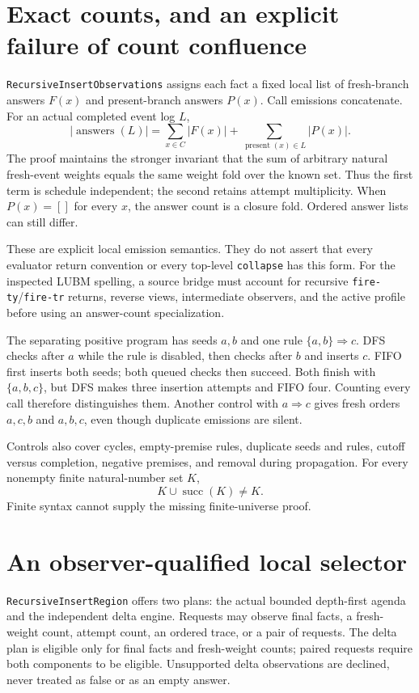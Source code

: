 \documentclass[11pt,a4paper]{article}
\newcommand{\code}[1]{\nolinkurl{#1}}
\begin{document}
\section{Exact counts, and an explicit failure of count confluence}

\code{RecursiveInsertObservations} assigns each fact a fixed local list of
fresh-branch answers $F(x)$ and present-branch answers $P(x)$. Call emissions
concatenate. For an actual completed event log $L$,
\[
  |\operatorname{answers}(L)|
  =\sum_{x\in C}|F(x)|
    +\sum_{\operatorname{present}(x)\in L}|P(x)|.
\]
The proof maintains the stronger invariant that the sum of arbitrary natural
fresh-event weights equals the same weight fold over the known set. Thus
the first term is schedule independent; the second retains attempt
multiplicity. When $P(x)=[]$ for every $x$, the answer count is a closure
fold. Ordered answer lists can still differ.

These are explicit local emission semantics. They do not assert that every
evaluator return convention or every top-level \code{collapse} has this form.
For the inspected LUBM spelling, a source bridge must account for recursive
\code{fire-ty}/\code{fire-tr} returns, reverse views, intermediate observers,
and the active profile before using an answer-count specialization.

The separating positive program has seeds $a,b$ and one rule
$\{a,b\}\Rightarrow c$. DFS checks after $a$ while the rule is disabled,
then checks after $b$ and inserts $c$. FIFO first inserts both seeds; both
queued checks then succeed. Both finish with $\{a,b,c\}$, but DFS makes three
insertion attempts and FIFO four. Counting every call therefore distinguishes
them. Another control with $a\Rightarrow c$ gives fresh orders $a,c,b$ and
$a,b,c$, even though duplicate emissions are silent.

Controls also cover cycles, empty-premise rules, duplicate seeds and rules,
cutoff versus completion, negative premises, and removal during propagation.
For every nonempty finite natural-number set $K$,
\[
  K\cup\operatorname{succ}(K)\ne K.
\]
Finite syntax cannot supply the missing finite-universe proof.

\section{An observer-qualified local selector}

\code{RecursiveInsertRegion} offers two plans: the actual bounded depth-first
agenda and the independent delta engine. Requests may observe final facts,
a fresh-weight count, attempt count, an ordered trace, or a pair of requests.
The delta plan is eligible only for final facts and fresh-weight counts;
paired requests require both components to be eligible. Unsupported delta
observations are declined, never treated as false or as an empty answer.
\end{document}
